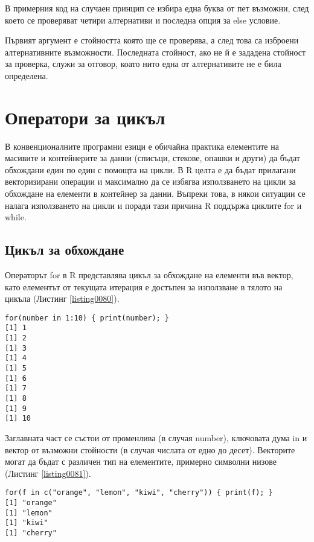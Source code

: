 В примерния код на случаен принцип се избира една буква от пет възможни, след което се проверяват четири алтернативи и последна опция за else условие. 

Първият аргумент е стойността която ще се проверява, а след това са изброени алтернативните възможности. Последната стойност, ако не й е зададена стойност за проверка, служи за отговор, коато нито една от алтернативите не е била определена. 

\section{Оператори за цикъл}

В конвенционалните програмни езици е обичайна практика елементите на масивите и контейнерите за данни (списъци, стекове, опашки и други) да бъдат обхождани един по един с помощта на цикли. В R целта е да бъдат прилагани векторизирани операции и максимално да се избягва използването на цикли за обхождане на елементи в контейнер за данни. Въпреки това, в някои ситуации се налага използването на цикли и поради тази причина R поддържа циклите for и while. 

\subsection{Цикъл за обхождане}

Операторът for в R представлява цикъл за обхождане на елементи във вектор, като елементът от текущата итерация е достъпен за използване в тялото на цикъла (Листинг \ref{listing0080}). 

\begin{lstlisting}[caption=Оператор за цикъл for, label=listing0080]
for(number in 1:10) { print(number); }
[1] 1
[1] 2
[1] 3
[1] 4
[1] 5
[1] 6
[1] 7
[1] 8
[1] 9
[1] 10
\end{lstlisting}

Заглавната част се състои от променлива (в случая number), ключовата дума in и вектор от възможни стойности (в случая числата от едно до десет). Векторите могат да бъдат с различен тип на елементите, примерно символни низове (Листинг \ref{listing0081}).

\begin{lstlisting}[caption=Обхождане на вектор от символни низове, label=listing0081]
for(f in c("orange", "lemon", "kiwi", "cherry")) { print(f); }
[1] "orange"
[1] "lemon"
[1] "kiwi"
[1] "cherry"
\end{lstlisting}

